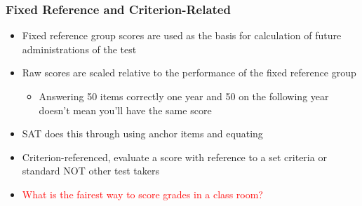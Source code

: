 \documentclass[dvipsnames]{beamer}\usepackage[]{graphicx}\usepackage[]{color}
\begin{document}
\begin{frame}
\frametitle{Fixed Reference and Criterion-Related}
\begin{itemize}
\item Fixed reference group scores are used as the basis for calculation of future administrations of the test
\item Raw scores are scaled relative to the performance of the fixed reference group
\begin{itemize}
    \item Answering 50 items correctly one year and 50 on the following year doesn't mean you'll have the same score
  \end{itemize}
\item SAT does this through using anchor items and equating
\item Criterion-referenced, evaluate a score with reference to a set criteria or standard NOT other test takers
\item \textcolor{red}{What is the fairest way to score grades in a class room?}
\end{itemize}
\end{frame}
\end{document}
